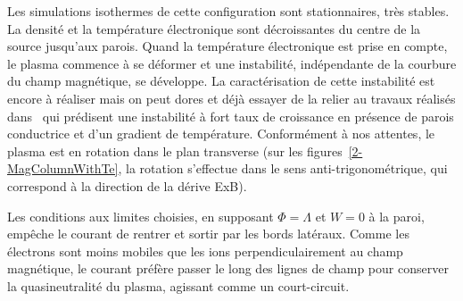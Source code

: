 \begin{refsection}
Les simulations isothermes de cette configuration sont stationnaires, très
stables. La densité et la température électronique sont décroissantes du
centre de la source jusqu'aux parois. Quand la température électronique est
prise en compte, le plasma commence à se déformer et une instabilité,
indépendante de la courbure du champ magnétique, se développe.
La caractérisation de cette instabilité est encore à réaliser
mais on peut dores et déjà essayer de la relier au travaux
réalisés dans~\parencite{Berk} qui prédisent une instabilité à fort taux de
croissance en présence de parois conductrice et d'un gradient de température.
Conformément à nos attentes, le plasma est en rotation dans le plan transverse (sur les
figures~\ref{2-MagColumnWithTe}, la rotation s'effectue dans le sens
anti-trigonométrique, qui correspond à la direction de la dérive ExB).

Les conditions aux limites choisies, en supposant $\Phi=\Lambda$ et $W=0$ à la
paroi, empêche le courant de rentrer et sortir par les bords latéraux. Comme
les électrons sont moins mobiles que les ions perpendiculairement au champ
magnétique, le courant préfère passer le long des lignes de champ pour conserver
la quasineutralité du plasma, agissant comme un court-circuit. 


\end{refsection}
